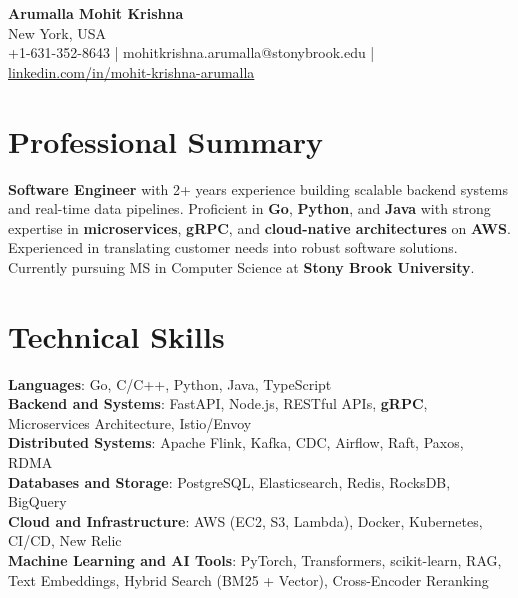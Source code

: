 \documentclass[letterpaper,11pt]{article}
\begin{document}
\begin{center}
  {\Large \textbf{Arumalla Mohit Krishna}} \\
  New York, USA \\
  +1-631-352-8643 \enspace | \enspace mohitkrishna.arumalla@stonybrook.edu \enspace | \enspace \href{https://www.linkedin.com/in/mohit-krishna-arumalla}{linkedin.com/in/mohit-krishna-arumalla}
\end{center}

\section{Professional Summary}
  \begin{itemize}[leftmargin=0.15in, label={}]
    \small{\item{
     \textbf{Software Engineer} with 2+ years experience building scalable backend systems and real-time data pipelines. Proficient in \textbf{Go}, \textbf{Python}, and \textbf{Java} with strong expertise in \textbf{microservices}, \textbf{gRPC}, and \textbf{cloud-native architectures} on \textbf{AWS}. Experienced in translating customer needs into robust software solutions. Currently pursuing MS in Computer Science at \textbf{Stony Brook University}.
    }}
  \end{itemize}
\vspace{-16pt}

\section{Technical Skills}
 \begin{itemize}[leftmargin=0.15in, label={}]
    \small{\item{
     \textbf{Languages}: Go, C/C++, Python, Java, TypeScript \\
     \textbf{Backend and Systems}: FastAPI, Node.js, RESTful APIs, \textbf{gRPC}, Microservices Architecture, Istio/Envoy \\
     \textbf{Distributed Systems}: Apache Flink, Kafka, CDC, Airflow, Raft, Paxos, RDMA \\
     \textbf{Databases and Storage}: PostgreSQL, Elasticsearch, Redis, RocksDB, BigQuery \\
     \textbf{Cloud and Infrastructure}: AWS (EC2, S3, Lambda), Docker, Kubernetes, CI/CD, New Relic \\
     \textbf{Machine Learning and AI Tools}: PyTorch, Transformers, scikit-learn, RAG, Text Embeddings, Hybrid Search (BM25 + Vector), Cross-Encoder Reranking
    }}
 \end{itemize}
\vspace{-16pt}
\end{document}
